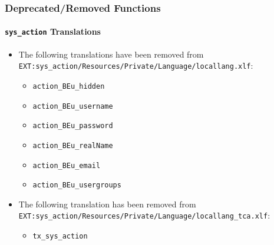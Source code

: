 \begin{frame}[fragile]
	\frametitle{Deprecated/Removed Functions}
	\framesubtitle{\texttt{sys\_action} Translations}

	\begin{itemize}
		\item The following translations have been removed from
			\smaller\texttt{EXT:sys\_action/Resources/Private/Language/locallang.xlf}:\normalsize

		\begin{itemize}
			\item \texttt{action\_BEu\_hidden}
			\item \texttt{action\_BEu\_username}
			\item \texttt{action\_BEu\_password}
			\item \texttt{action\_BEu\_realName}
			\item \texttt{action\_BEu\_email}
			\item \texttt{action\_BEu\_usergroups}
		\end{itemize}

		\item The following translation has been removed from
			\smaller\texttt{EXT:sys\_action/Resources/Private/Language/locallang\_tca.xlf}:\normalsize

		\begin{itemize}
			\item \texttt{tx\_sys\_action}
		\end{itemize}

	\end{itemize}

\end{frame}



